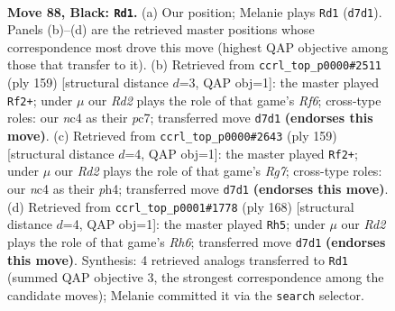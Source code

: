 \documentclass[11pt]{article}
\begin{document}
\clearpage

\begin{figure}[p]\centering
\begin{subfigure}{0.46\textwidth}\centering
\resizebox{\linewidth}{!}{%
\newchessgame
\chessboard[
  setfen={8/3r4/k7/5K2/2N5/1R6/6P1/8 b - - 41 88},
  showmover=false,
  pgfstyle=straightmove, color=movearrow, markmove={d7-d1}
]}
\caption{}
\end{subfigure}\hfill
\begin{subfigure}{0.46\textwidth}\centering
\resizebox{\linewidth}{!}{%
\newchessgame
\chessboard[
  setfen={8/k1P5/6R1/p7/8/5r2/1K6/8 b - - 0 80},
  showmover=false,
  pgfstyle=straightmove, color=movearrow, markmove={f3-f2}
]}
\caption{}
\end{subfigure}
\\[4pt]
\begin{subfigure}{0.46\textwidth}\centering
\resizebox{\linewidth}{!}{%
\newchessgame
\chessboard[
  setfen={8/4k3/8/p4K2/7P/3R4/6r1/8 b - - 9 80},
  showmover=false,
  pgfstyle=straightmove, color=movearrow, markmove={g2-f2}
]}
\caption{}
\end{subfigure}\hfill
\begin{subfigure}{0.46\textwidth}\centering
\resizebox{\linewidth}{!}{%
\newchessgame
\chessboard[
  setfen={1k6/8/7R/p1N5/8/8/6r1/4K3 w - - 18 85},
  showmover=false,
  pgfstyle=straightmove, color=movearrow, markmove={h6-h5}
]}
\caption{}
\end{subfigure}
\caption{\textbf{Move 88, Black: \texttt{Rd1}.} (a) Our position; Melanie plays \texttt{Rd1} (\texttt{d7d1}). Panels (b)--(d) are the retrieved master positions whose correspondence most drove this move (highest QAP objective among those that transfer to it). (b) Retrieved from \texttt{ccrl\_top\_p0000\#2511} (ply 159) [structural distance $d$=3, QAP obj=1]: the master played \texttt{Rf2+}; under $\mu$ our \emph{Rd2} plays the role of that game's \emph{Rf6}; cross-type roles: our \emph{n}c4 as their \emph{p}c7; transferred move \texttt{d7d1} \textbf{(endorses this move)}. (c) Retrieved from \texttt{ccrl\_top\_p0000\#2643} (ply 159) [structural distance $d$=4, QAP obj=1]: the master played \texttt{Rf2+}; under $\mu$ our \emph{Rd2} plays the role of that game's \emph{Rg7}; cross-type roles: our \emph{n}c4 as their \emph{p}h4; transferred move \texttt{d7d1} \textbf{(endorses this move)}. (d) Retrieved from \texttt{ccrl\_top\_p0001\#1778} (ply 168) [structural distance $d$=4, QAP obj=1]: the master played \texttt{Rh5}; under $\mu$ our \emph{Rd2} plays the role of that game's \emph{Rh6}; transferred move \texttt{d7d1} \textbf{(endorses this move)}. Synthesis: 4 retrieved analogs transferred to \texttt{Rd1} (summed QAP objective 3, the strongest correspondence among the candidate moves); Melanie committed it via the \texttt{search} selector.}
\label{fig:thought-m175}
\end{figure}
\end{document}
